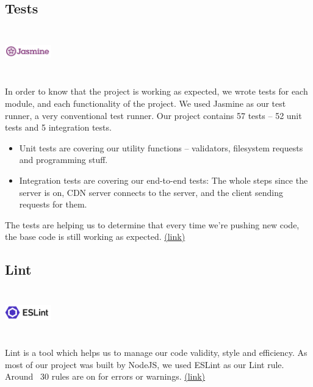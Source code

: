 \documentclass{report}
\begin{document}
\subsection {Tests}
     \begin{minipage}{\linewidth}
            \includegraphics[width=2cm,height=2cm,keepaspectratio]{jasmine}
        \end{minipage}
\hfill \break
In order to know that the project is working as expected, we wrote tests for each module, and each functionality of the project.\hfill \break
We used Jasmine as our test runner, a very conventional test runner.\hfill \break
Our project contains 57 tests – 52 unit tests and 5 integration tests.
\begin{itemize}
\item Unit tests are covering our utility functions – validators, filesystem requests and programming stuff.
\item Integration tests are covering our end-to-end tests: The whole steps since the server is on, \gls{CDN} server connects to the server, and the client sending requests for them.
\end{itemize}
The tests are helping us to determine that every time we’re pushing new code, the base code is still working as expected. \href{https://jasmine.github.io/}{(link)} 
\subsection {Lint}
     \begin{minipage}{\linewidth}
            \includegraphics[width=2cm,height=2cm,keepaspectratio]{eslint}
        \end{minipage} \hfill \break 
Lint is a tool which helps us to manage our code validity, style and efficiency. As most of our project was built by NodeJS, we used ESLint as our Lint rule. Around ~30 rules are on for errors or warnings. \href{https://eslint.org/}{(link)} 
\end{document}
